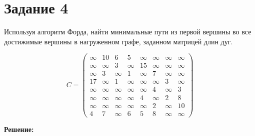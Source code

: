 \section*{Задание 4}

Используя алгоритм Форда, найти минимальные пути из первой вершины во все достижимые вершины в нагруженном графе, заданном матрицей длин дуг.

 $$C = \begin{pmatrix}
 \infty&10&6&5&\infty&\infty&\infty&\infty \\
 \infty&\infty&3&\infty&15&\infty&\infty&\infty \\
 \infty&3&\infty&1&\infty&7&\infty&\infty \\
17&\infty&1&\infty&\infty&\infty&3&\infty \\
 \infty&\infty&\infty&\infty&\infty&4&\infty&3 \\
 \infty&\infty&\infty&\infty&4&\infty&2&8 \\
 \infty&\infty&\infty&\infty&\infty&2&\infty&10 \\
 4&7&\infty&6&5&8&\infty&\infty
 \end{pmatrix}$$

\vspace{\baselineskip}

{\large\textbf{Решение:}}

